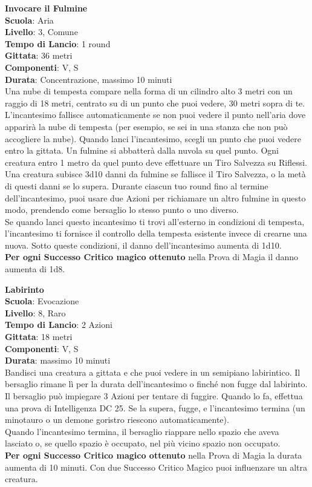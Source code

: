 \begin{multicols}{2}
\medskip\textbf{Invocare il Fulmine}\\
\textbf{Scuola}: Aria\\
\textbf{Livello}: 3, Comune\\
\textbf{Tempo di Lancio}: 1 round\\
\textbf{Gittata}: 36 metri\\
\textbf{Componenti}: V, S\\
\textbf{Durata}: Concentrazione, massimo 10 minuti\\
Una nube di tempesta compare nella forma di un cilindro alto 3 metri con un raggio di 18 metri, centrato su di un punto che puoi vedere, 30 metri sopra di te. L'incantesimo fallisce automaticamente se non puoi vedere il punto nell'aria dove apparirà la nube di tempesta (per esempio, se sei in una stanza che non può accogliere la nube). Quando lanci l'incantesimo, scegli un punto che puoi vedere entro la gittata. Un fulmine si abbatterà dalla nuvola su quel punto. Ogni creatura entro 1 metro da quel punto deve effettuare un Tiro Salvezza su Riflessi. Una creatura subisce 3d10 danni da fulmine se fallisce il Tiro Salvezza, o la metà di questi danni se lo supera. Durante ciascun tuo round fino al termine dell'incantesimo, puoi usare due Azioni per richiamare un altro fulmine in questo modo, prendendo come bersaglio lo stesso punto o uno diverso.\\
Se quando lanci questo incantesimo ti trovi all'esterno in condizioni di tempesta, l'incantesimo ti fornisce il controllo della tempesta esistente invece di crearne una nuova. Sotto queste condizioni, il danno dell'incantesimo aumenta di 1d10. \\
\textbf{Per ogni Successo Critico magico ottenuto} nella Prova di Magia il danno aumenta di 1d8.

\medskip\textbf{Labirinto}\\
\textbf{Scuola}: Evocazione\\
\textbf{Livello}: 8, Raro\\
\textbf{Tempo di Lancio}: 2 Azioni\\
\textbf{Gittata}: 18 metri\\
\textbf{Componenti}: V, S\\
\textbf{Durata}: massimo 10 minuti\\
Bandisci una creatura a gittata e che puoi vedere in un semipiano labirintico. Il bersaglio rimane lì per la durata dell'incantesimo o finché non fugge dal labirinto. Il bersaglio può impiegare 3 Azioni per tentare di fuggire. Quando lo fa, effettua una prova di Intelligenza DC 25. Se la supera, fugge, e l'incantesimo termina (un minotauro o un demone goristro riescono automaticamente).\\
Quando l'incantesimo termina, il bersaglio riappare nello spazio che aveva lasciato o, se quello spazio è occupato, nel più vicino spazio non occupato.\\
\textbf{Per ogni Successo Critico magico ottenuto} nella Prova di Magia la durata aumenta di 10 minuti. Con due Successo Critico Magico puoi influenzare un altra creatura.\\


\end{multicols}
